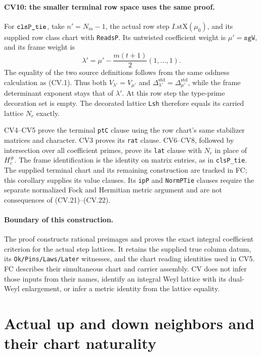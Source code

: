 \documentclass[11pt,a4paper]{article}
\numberwithin{equation}{section}
\theoremstyle{remark}\newtheorem{remark}[theorem]{Remark}
\begin{document}
\paragraph{CV10: the smaller terminal row space uses the same proof.}
For \(\texttt{clsP\_\allowbreak tie}\), take \(n'=N_m-1\), the actual
row step \(I.\mathrm{stX}(\mu_0)\), and its supplied row
class chart with \texttt{ReadsP}. Its untwisted coefficient
weight is \(\mu'=\texttt{sgW}\), and its frame weight is
\[
                  \lambda'=\mu'-\frac{m(t+1)}2(1,\ldots,1).
                                                               \tag{CV.23}
\]
The equality of the two source definitions follows from
the same oddness calculation as (CV.1). Thus both
\(V_{\lambda'}=V_{\mu'}\) and
\(\Delta_{\lambda'}^{\mathrm{std}}
 =\Delta_{\mu'}^{\mathrm{std}}\), while the frame
determinant exponent stays that of \(\lambda'\).
At this row step the type-prime decoration set is empty.
The decorated lattice \texttt{Lsh} therefore equals its
carried lattice \(N_c\) exactly.

CV4--CV5 prove the terminal \texttt{ptC} clause using the
row chart's same stabilizer matrices and character.
CV3 proves its \texttt{rat} clause.
CV6--CV8, followed by intersection over all coefficient
primes, prove its \texttt{lat} clause with \(N_c\) in place
of \(H_c^\#\). The frame identification is the identity
on matrix entries, as in \texttt{clsP\_\allowbreak tie}.
The supplied terminal chart and its remaining construction are tracked in FC; this
corollary supplies its value clauses. Its
\texttt{ipP} and \texttt{NormPTie} clauses require the
separate normalized Fock and Hermitian metric argument
and are not consequences of (CV.21)--(CV.22).

\paragraph{Boundary of this construction.}
The proof constructs rational preimages and proves the
exact integral coefficient criterion for the actual
step lattices. It retains the supplied true column datum,
its \texttt{Ok/Pins/Laws/Later} witnesses, and the chart
reading identities used in CV5. FC describes their
simultaneous chart and carrier assembly. CV does not
infer those inputs from their names, identify an
integral Weyl lattice with its dual-Weyl enlargement,
or infer a metric identity from the lattice equality.


\section{Actual up and down neighbors and their chart naturality}
\label{sec:neighbor-geometry}
\end{document}
